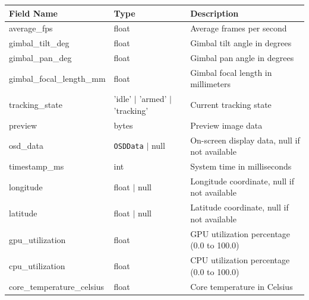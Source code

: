 \documentclass[12pt, titlepage]{article}
\begin{document}
\begin{center}
  \begin{tabular}{p{4cm} p{3cm} p{8cm}}
    \toprule
    \textbf{Field Name}         & \textbf{Type}                     & \textbf{Description}                                            \\
    \midrule
    average\_fps                & float                             & Average frames per second                                       \\
    gimbal\_tilt\_deg           & float                             & Gimbal tilt angle in degrees                                    \\
    gimbal\_pan\_deg            & float                             & Gimbal pan angle in degrees                                     \\
    gimbal\_focal\_length\_mm   & float                             & Gimbal focal length in millimeters                              \\
    tracking\_state             & 'idle' $|$ 'armed' $|$ 'tracking' & Current tracking state                                          \\
    preview                     & bytes                             & Preview image data                                              \\
    osd\_data                   & \texttt{OSDData} $|$ null         & On-screen display data, null if not available                   \\
    timestamp\_ms               & int                               & System time in milliseconds                                     \\
    longitude                   & float $|$ null                    & Longitude coordinate, null if not available                     \\
    latitude                    & float $|$ null                    & Latitude coordinate, null if not available                      \\
    gpu\_utilization            & float                             & GPU utilization percentage (0.0 to 100.0)                       \\
    cpu\_utilization            & float                             & CPU utilization percentage (0.0 to 100.0)                       \\
    core\_temperature\_celsius  & float                             & Core temperature in Celsius                                     \\

\end{tabular}
\end{center}
\end{document}
